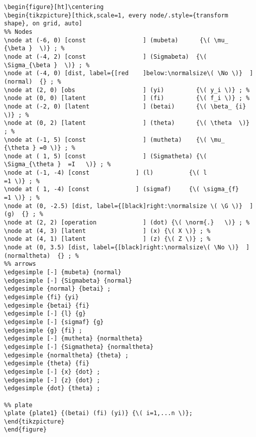 \documentclass[a4paper]{article}
\begin{document}
\lstset{numbers=left,language=[LaTeX]TeX,label= ,caption= ,captionpos=b}
\begin{lstlisting}
\begin{figure}[ht]\centering
\begin{tikzpicture}[thick,scale=1, every node/.style={transform shape}, on grid, auto]
%% Nodes
\node at (-6, 0) [const                ] (mubeta)      {\( \mu_   {\beta }  \)} ; %
\node at (-4, 2) [const                ] (Sigmabeta)  {\( \Sigma_{\beta }  \)} ; %
\node at (-4, 0) [dist, label={[red    ]below:\normalsize\( \No \)}  ] (normal)  {} ; %
\node at (2, 0) [obs                   ] (yi)         {\( y_i \)} ; %
\node at (0, 0) [latent                ] (fi)         {\( f_i \)} ; %
\node at (-2, 0) [latent               ] (betai)      {\( \beta_ {i}  \)} ; %
\node at (0, 2) [latent                ] (theta)      {\( \theta  \)} ; %
\node at (-1, 5) [const                ] (mutheta)    {\( \mu_   {\theta } =0 \)} ; %
\node at ( 1, 5) [const                ] (Sigmatheta) {\( \Sigma_{\theta }	=I   \)} ; %
\node at (-1, -4) [const             ] (l)          {\( l				=1 \)} ; %
\node at ( 1, -4) [const             ] (sigmaf)     {\( \sigma_{f}		=1 \)} ; %
\node at (0, -2.5) [dist, label={[black]right:\normalsize \( \G \)}  ] (g)  {} ; % 
\node at (2, 2) [operation             ] (dot) {\( \norm{.}   \)} ; %
\node at (4, 3) [latent                ] (x) {\( X \)} ; %
\node at (4, 1) [latent                ] (z) {\( Z \)} ; %
\node at (0, 3.5) [dist, label={[black]right:\normalsize\( \No \)}  ] (normaltheta)  {} ; % 
%% arrows
\edgesimple [-] {mubeta} {normal}
\edgesimple [-] {Sigmabeta} {normal}
\edgesimple {normal} {betai} ;
\edgesimple {fi} {yi}
\edgesimple {betai} {fi}
\edgesimple [-] {l} {g}
\edgesimple [-] {sigmaf} {g}
\edgesimple {g} {fi} ;
\edgesimple [-] {mutheta} {normaltheta}
\edgesimple [-] {Sigmatheta} {normaltheta}
\edgesimple {normaltheta} {theta} ;
\edgesimple {theta} {fi}
\edgesimple [-] {x} {dot} ;
\edgesimple [-] {z} {dot} ;
\edgesimple {dot} {theta} ;

%% plate
\plate {plate1} {(betai) (fi) (yi)} {\( i=1,...n \)}; 
\end{tikzpicture}
\end{figure}
\end{lstlisting}
\end{document}
